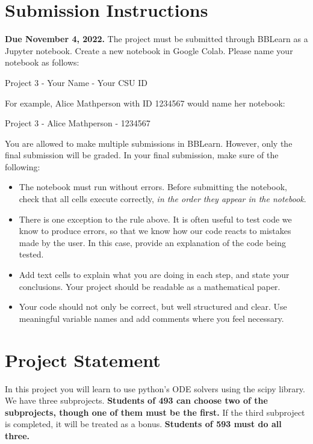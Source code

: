 \documentclass[12pt]{article}
\begin{document}
\sffamily

\section{Submission Instructions}
\textbf{Due November 4, 2022.} The project must be submitted through BBLearn as a Jupyter notebook. Create a new notebook in Google Colab. Please name your notebook as follows:

\begin{center}
Project 3 - Your Name - Your CSU ID
\end{center}

For example, Alice Mathperson with ID 1234567 would name her notebook:

\begin{center}
Project 3 - Alice Mathperson - 1234567
\end{center}

You are allowed to make multiple submissions in BBLearn. However, only the final submission will be graded. In your final submission, make sure of the following:

\begin{itemize}
\item The notebook must run without errors. Before submitting the notebook, check that all cells execute correctly, \emph{in the order they appear in the notebook}.
\item There is one exception to the rule above. It is often useful to test code we know to produce errors, so that we know how our code reacts to mistakes made by the user. In this case, provide an explanation of the code being tested.
\item Add text cells to explain what you are doing in each step, and state your conclusions. Your project should be readable as a mathematical paper.
\item Your code should not only be correct, but well structured and clear. Use meaningful variable names and add comments where you feel necessary.
\end{itemize}

\section{Project Statement}
In this project you will learn to use python's ODE solvers using the scipy library. We have three subprojects. \textbf{Students of 493 can choose two of the subprojects, though one of them must be the first.} If the third subproject is completed, it will be treated as a bonus. \textbf{Students of 593 must do all three.}
\end{document}
